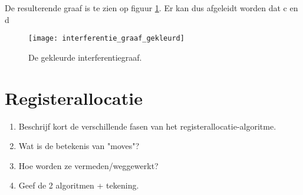 \documentclass{report}
\begin{document}
{\begin{enumerate}
\begin{enumerate}
			\end{enumerate}
			De resulterende graaf is te zien op figuur \ref{fig:interferentie_graaf_gekleurd}. Er kan dus afgeleidt worden dat c en d 
			\begin{figure}
				\texttt{[image: interferentie\_graaf\_gekleurd]}
				\caption{De gekleurde interferentiegraaf.}
				\label{fig:interferentie_graaf_gekleurd}
			\end{figure}
		\end{enumerate}

	}
	\newpage
\section{Registerallocatie}
	\begin{enumerate}
		\item Beschrijf kort de verschillende fasen van het registerallocatie-algoritme.
		\item Wat is de betekenis van "moves"?
		\item Hoe worden ze vermeden/weggewerkt?
		\item Geef de 2 algoritmen + tekening. 
	\end{enumerate} 
\end{document}
